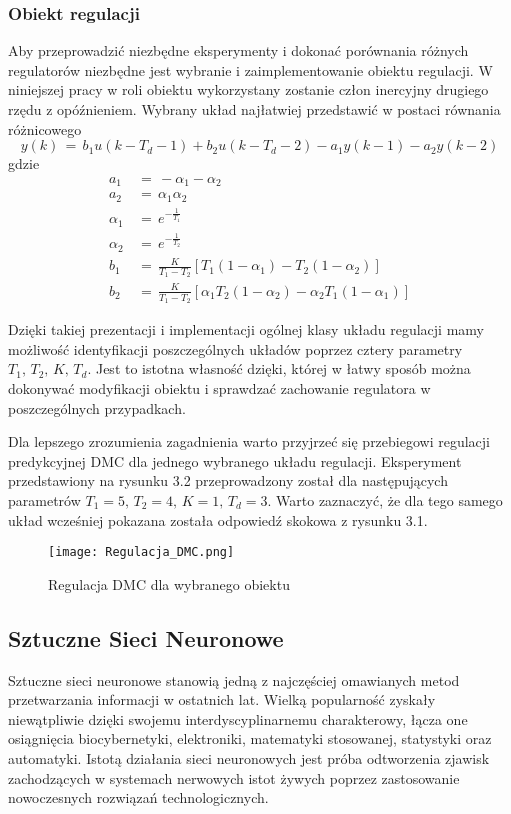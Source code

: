 \subsubsection{Obiekt regulacji}
Aby przeprowadzić niezbędne eksperymenty i dokonać porównania różnych regulatorów niezbędne jest wybranie i zaimplementowanie obiektu regulacji. W niniejszej pracy w roli obiektu wykorzystany zostanie człon inercyjny drugiego rzędu z opóźnieniem. Wybrany układ najłatwiej przedstawić w postaci równania różnicowego 
\begin{equation}
y(k) \, = \, b_1u(k-T_d-1) + b_2u(k-T_d-2)-a_1y(k-1)-a_2y(k-2)
\end{equation}
gdzie 
\begin{align*}
a_1 \, &= \, -\alpha_1 -\alpha_2 \\
a_2 \, &= \, \alpha_1\alpha_2 \\
\alpha_1 \, &= \, e^{-\frac{1}{T_1}} \\
\alpha_2 \, &= \, e^{-\frac{1}{T_2}} \\
b_1 \, &= \, \frac{K}{T_1 - T_2}[T_1(1-\alpha_1)-T_2(1-\alpha_2)] \\
b_2 \, &= \, \frac{K}{T_1 - T_2}[\alpha_1 T_2(1-\alpha_2)-\alpha_2 T_1(1-\alpha_1)]
\end{align*}

\par Dzięki takiej prezentacji i implementacji ogólnej klasy układu regulacji mamy możliwość identyfikacji poszczególnych układów poprzez cztery parametry \( T_1, \, T_2, \, K, \, T_d \). Jest to istotna własność dzięki, której w łatwy sposób można dokonywać modyfikacji obiektu i sprawdzać zachowanie regulatora w poszczególnych przypadkach.

\par Dla lepszego zrozumienia zagadnienia warto przyjrzeć się przebiegowi regulacji predykcyjnej DMC dla jednego wybranego układu regulacji. Eksperyment przedstawiony na rysunku 3.2 przeprowadzony został dla następujących parametrów \( T_1=5, \, T_2=4, \, K=1, \, T_d=3 \). Warto zaznaczyć, że dla tego samego układ wcześniej pokazana została odpowiedź skokowa z rysunku 3.1.  
\begin{figure}[!h]
    \label{fig:Regulacja-DMC}
    \centering \texttt{[image: Regulacja\_DMC.png]}
    \caption{Regulacja DMC dla wybranego obiektu}
\end{figure}

\subsection{Sztuczne Sieci Neuronowe}
Sztuczne sieci neuronowe stanowią jedną z najczęściej omawianych metod przetwarzania informacji w ostatnich lat. Wielką popularność zyskały niewątpliwie dzięki swojemu interdyscyplinarnemu charakterowy, łącza one osiągnięcia biocybernetyki, elektroniki, matematyki stosowanej, statystyki oraz automatyki. Istotą działania sieci neuronowych jest próba odtworzenia zjawisk zachodzących w systemach nerwowych istot żywych poprzez zastosowanie nowoczesnych rozwiązań technologicznych.

